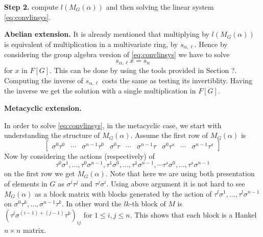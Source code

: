 \textbf{Step 2.} compute $l(M_G(\alpha))$ and then solving the linear system \eqref{eq:convlinsys}.

\textbf{Abelian extension.}
It is already mentioned that multiplying by $l(M_G(\alpha))$ is equivalent of multiplication in a multivariate ring, by 
$s_{\alpha, \ell}$. Hence by considering the group algebra version of \eqref{eq:convlinsys} we have to solve $$s_{\alpha,\ell} x 
= s_u$$ for $x$ 
in $F[G]$. This can be done by using the tools provided in Section ?. Computing the inverse of $s_{\alpha,\ell}$ costs the same 
as testing its invertiblity. Having the inverse we get the solution with a single multiplication in $F[G]$.

\textbf{Metacyclic extension.}

In order to solve \eqref{eq:convlinsys}, in the metacyclic case, we start with understanding the structure of $M_G(\alpha)$. 
Assume the first row of $M_G(\alpha)$ is 
$$\begin{bmatrix}
\sigma^0 \tau^0 &  \cdots & \sigma^{n-1} \tau^0 & \sigma^0 \tau &  \cdots & \sigma^{n-1} \tau & \sigma^0 \tau^s &  \cdots & 
\sigma^{n-1} \tau^s 
\end{bmatrix}$$
Now by considering the actions (respectively) of
$$\tau^0 \sigma^1, \ldots , \tau^0 \sigma^{n-1}, \tau^1 \sigma^0, \ldots , \tau^1 \sigma^{n-1} , \cdots \tau^s \sigma^0, \ldots 
, \tau^s \sigma^{n-1}$$
on the first row we get $M_G(\alpha)$.
Note that here we are using both presentation of elements in $G$ as $\sigma^i\tau^j$ and $\tau^j\sigma^i$. Using above argument 
it is not hard to see $M_G(\alpha)$ as a block matrix with blocks generated by the action of $\tau^l \sigma^1, \ldots , \tau^l 
\sigma^{n-1}$ on $\sigma^0 \tau^k ,  \ldots , \sigma^{n-1} \tau^k$. In other word the $lk$-th block of $M$ is 
$\left( \tau^l \sigma^{(i-1)+(j-1)} \tau^k \right)_{ij}$ for $1 \leq i,j \leq n$. This shows that each block is a Hankel $n \times n$ matrix.



